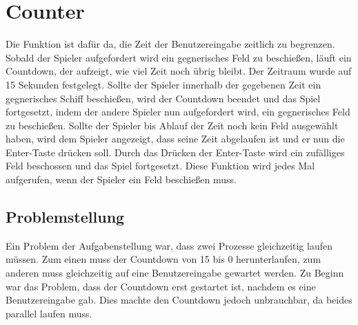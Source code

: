 \documentclass{article}
\begin{document}
\section{Counter}
    Die Funktion ist dafür da, die Zeit der Benutzereingabe zeitlich zu begrenzen. Sobald der Spieler aufgefordert wird ein gegnerisches Feld zu beschießen,  läuft ein Countdown, der aufzeigt, wie viel Zeit noch übrig bleibt. Der Zeitraum wurde auf 15 Sekunden festgelegt. Sollte der Spieler innerhalb der gegebenen Zeit ein gegnerisches Schiff beschießen, wird der Countdown beendet und das Spiel fortgesetzt, indem der andere Spieler nun aufgefordert wird, ein gegnerisches Feld zu beschießen. Sollte der Spieler bis Ablauf der Zeit noch kein Feld ausgewählt haben, wird dem Spieler angezeigt, dass seine Zeit abgelaufen ist und er nun die Enter-Taste drücken soll. Durch das Drücken der Enter-Taste wird ein zufälliges Feld beschossen und das Spiel fortgesetzt.
    Diese Funktion wird jedes Mal aufgerufen, wenn der Spieler ein Feld beschießen muss.

\subsection{Problemstellung}
    Ein Problem der Aufgabenstellung war, dass zwei Prozesse gleichzeitig laufen müssen. Zum einen muss der Countdown von 15 bis 0 herunterlaufen, zum anderen muss gleichzeitig auf eine Benutzereingabe gewartet werden. Zu Beginn war das Problem, dass der Countdown erst gestartet ist, nachdem es eine Benutzereingabe gab. Dies machte den Countdown jedoch unbrauchbar, da beides parallel laufen muss.
\end{document}
